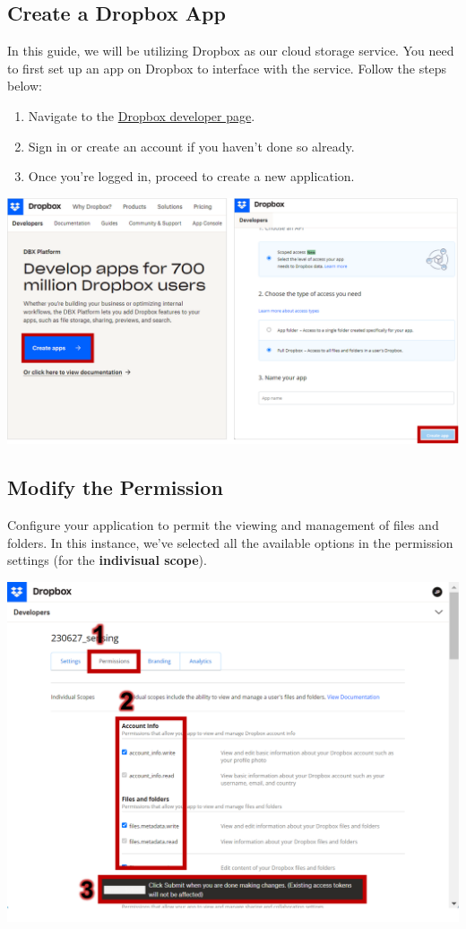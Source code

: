 \documentclass[
  letterpaper,
]{scrbook}
\providecommand{\tightlist}{%
  \setlength{\itemsep}{0pt}\setlength{\parskip}{0pt}}\usepackage{longtable,booktabs,array}
\begin{document}
\subsection{Create a Dropbox App}\label{create-a-dropbox-app}

In this guide, we will be utilizing Dropbox as our cloud storage
service. You need to first set up an app on Dropbox to interface with
the service. Follow the steps below:

\begin{enumerate}
\def\labelenumi{\arabic{enumi}.}
\tightlist
\item
  Navigate to the \href{https://www.dropbox.com/developers/}{Dropbox
  developer page}.
\item
  Sign in or create an account if you haven't done so already.
\item
  Once you're logged in, proceed to create a new application.
\end{enumerate}

\includegraphics{content/material/ch2/dropbox_create.png}

\subsection{Modify the Permission}\label{modify-the-permission}

Configure your application to permit the viewing and management of files
and folders. In this instance, we've selected all the available options
in the permission settings (for the \textbf{indivisual scope}).

\includegraphics{content/material/ch2/dropbox_permission.png}
\end{document}
